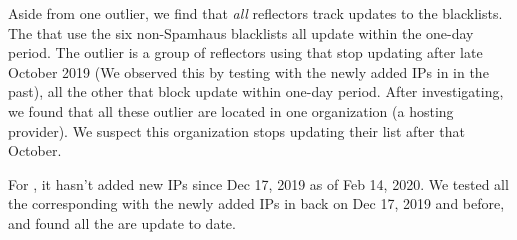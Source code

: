 


Aside from one outlier, we find that \textit{all} reflectors track
updates to the blacklists. The {} that use the six
non-Spamhaus blacklists all update within the one-day period. The
outlier is a group of reflectors using {\spamhausdrop} that stop updating
after late October 2019 (We observed this by testing with the newly added IPs
in {\spamhausdrop} in the past), all the other {} that block
{\spamhausdrop} update within one-day period. After investigating, we found that
all these outlier {} are located in one organization (a hosting
provider). We suspect this organization stops updating their list after that
October.

For {\spamhausedrop}, it hasn't added new IPs since Dec 17, 2019 as of Feb 14,
2020. We tested all the corresponding {} with the newly added IPs
in {\spamhausedrop} back on Dec 17, 2019 and before, and found all the
{} are update to date.



